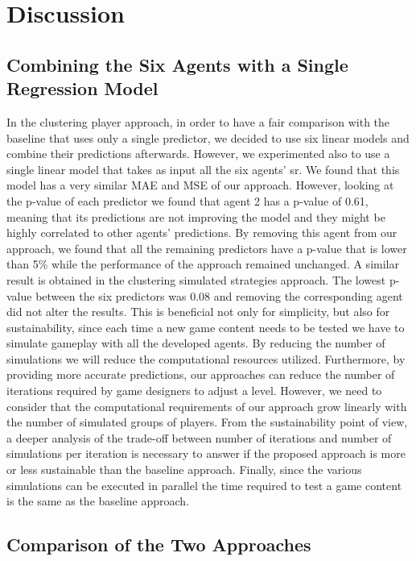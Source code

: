 \chapter{Discussion}
\label{chap:discussion}

\section{Combining the Six Agents with a Single Regression Model}
In the clustering player approach, in order to have a fair comparison with the baseline that uses only a single predictor, we decided to use six linear models and combine their predictions afterwards. However, we experimented also to use a single linear model that takes as input all the six agents' \acs{sr}. We found that this model has a very similar MAE and MSE of our approach. However, looking at the p-value of each predictor we found that agent 2 has a p-value of 0.61, meaning that its predictions are not improving the model and they might be highly correlated to other agents' predictions. By removing this agent from our approach, we found that all the remaining predictors have a p-value that is lower than 5\% while the performance of the approach remained unchanged. A similar result is obtained in the clustering simulated strategies approach. The lowest p-value between the six predictors was 0.08 and removing the corresponding agent did not alter the results. This is beneficial not only for simplicity, but also for sustainability, since each time a new game content needs to be tested we have to simulate gameplay with all the developed agents. By reducing the number of simulations we will reduce the computational resources utilized. Furthermore, by providing more accurate predictions, our approaches can reduce the number of iterations required by game designers to adjust a level. However, we need to consider that the computational requirements of our approach grow linearly with the number of simulated groups of players. From the sustainability point of view, a deeper analysis of the trade-off between number of iterations and number of simulations per iteration is necessary to answer if the proposed approach is more or less sustainable than the baseline approach. Finally, since the various simulations can be executed in parallel the time required to test a game content is the same as the baseline approach.


\section{Comparison of the Two Approaches}

